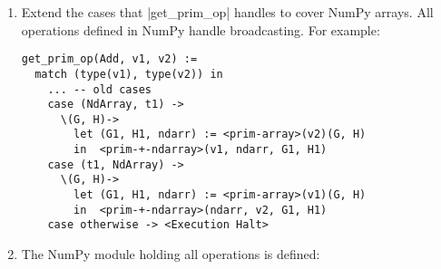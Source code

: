 \begin{enumerate}
Note: The values stored inside a NumPy array are considered irrelevant
  in this work. The Value Analysis built in this work considers only the
  shape of tensors, as tensors can be huge and their contents do not
  often influence their shape. Therefore, it would be wasteful to give a
  detailed specification of the NumPy library primitives.

  Nonetheless, defining formally each one of the NumPy functions above is
  fairly straightforward. Although, the hardest part of a formal
  definition of NumPy arrays is detailing how \pycode|array| works. To
  define the function \pycode|<np-array>| one
  must consider the many input cases it can handle, and it can handle
  almost any Python object\footnote{The NumPy function \pycode|array|
    takes almost anything as an input. \pycode|array| tries to
    interpret its input as an array in any way it can. There is no
    formal definition of how the values are interpreted although its
    semantics can be extracted by looking at its C implementation:
    https://stackoverflow.com/a/40380014}.

  Once the \pycode|<np-array>| function is
  implemented all other functions are much simpler to define. As an
  example, the implementation of the function \pycode|size| is:

\begin{verbatim}
<prim-np-size>(val)(G, H) :=
   -- We know that `<prim-array>` always returns an NdArray
   let (G, H, (NdArray, addr, arr)) := <prim-array>(val)(G, H)
   -- We know that a NdArray has a special value called `shape`
       (Tuple, addrtup, tup) := arr('shape')
   in  tup('size')
\end{verbatim}
\item
  Extend the cases that \pycode|get_prim_op| handles to cover NumPy
  arrays. All operations defined in NumPy handle broadcasting.
  For example:

\begin{verbatim}
get_prim_op(Add, v1, v2) :=
  match (type(v1), type(v2)) in
    ... -- old cases
    case (NdArray, t1) ->
      \(G, H)->
        let (G1, H1, ndarr) := <prim-array>(v2)(G, H)
        in  <prim-+-ndarray>(v1, ndarr, G1, H1)
    case (t1, NdArray) ->
      \(G, H)->
        let (G1, H1, ndarr) := <prim-array>(v1)(G, H)
        in  <prim-+-ndarray>(ndarr, v2, G1, H1)
    case otherwise -> <Execution Halt>
\end{verbatim}
\item
  The NumPy module holding all operations is defined:


\end{enumerate}
